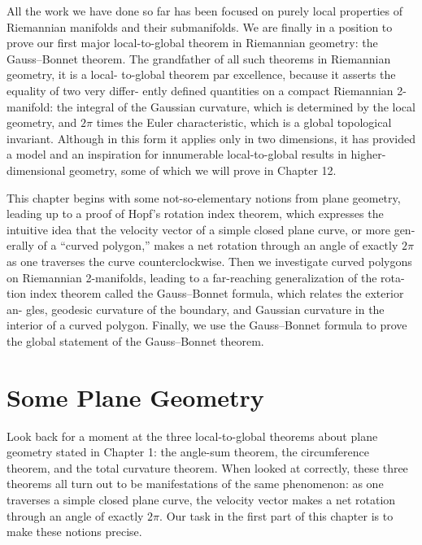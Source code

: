 
All the work we have done so far has been focused on purely local properties of
Riemannian manifolds and their submanifolds. We are finally in a position to prove
our first major local-to-global theorem in Riemannian geometry: the Gauss--Bonnet
theorem. The grandfather of all such theorems in Riemannian geometry, it is a local-
to-global theorem par excellence, because it asserts the equality of two very differ-
ently defined quantities on a compact Riemannian 2-manifold: the integral of the
Gaussian curvature, which is determined by the local geometry, and $2\pi$ times the
Euler characteristic, which is a global topological invariant. Although in this form
it applies only in two dimensions, it has provided a model and an inspiration for
innumerable local-to-global results in higher-dimensional geometry, some of which
we will prove in Chapter 12.

This chapter begins with some not-so-elementary notions from plane geometry,
leading up to a proof of Hopf's rotation index theorem, which expresses the
intuitive idea that the velocity vector of a simple closed plane curve, or more gen-
erally of a ``curved polygon,'' makes a net rotation through an angle of exactly $2\pi$
as one traverses the curve counterclockwise. Then we investigate curved polygons
on Riemannian 2-manifolds, leading to a far-reaching generalization of the rota-
tion index theorem called the Gauss--Bonnet formula, which relates the exterior an-
gles, geodesic curvature of the boundary, and Gaussian curvature in the interior of
a curved polygon. Finally, we use the Gauss--Bonnet formula to prove the global
statement of the Gauss--Bonnet theorem.

\section{Some Plane Geometry}

Look back for a moment at the three local-to-global theorems about plane geometry
stated in Chapter 1: the angle-sum theorem, the circumference theorem, and the total
curvature theorem. When looked at correctly, these three theorems all turn out to be
manifestations of the same phenomenon: as one traverses a simple closed plane
curve, the velocity vector makes a net rotation through an angle of exactly $2\pi$. Our
task in the first part of this chapter is to make these notions precise.

